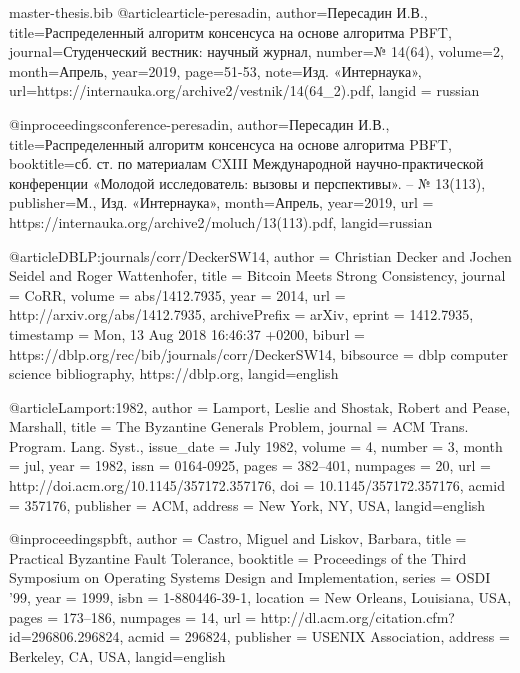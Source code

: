 \begin{filecontents}{master-thesis.bib}
@article{article-peresadin,
  author={Пересадин И.В.},
  title={{Распределенный алгоритм консенсуса на основе алгоритма PBFT}},
  journal={Студенческий вестник: научный журнал},
  number={№ 14(64)},
  volume={2},
  month={Апрель},
  year={2019},
  page={51-53},
  note={Изд. «Интернаука»},
  url={https://internauka.org/archive2/vestnik/14(64_2).pdf},
  langid = {russian}
}

@inproceedings{conference-peresadin,
  author={Пересадин И.В.},
  title={{Распределенный алгоритм консенсуса на основе алгоритма PBFT}},
  booktitle={сб. ст. по материалам CXIII Международной научно-практической конференции «Молодой исследователь: вызовы и перспективы». – № 13(113)},
  publisher={М., Изд. «Интернаука»},
  month={Апрель},
  year={2019},
  url = {https://internauka.org/archive2/moluch/13(113).pdf},
  langid={russian}
}

@article{DBLP:journals/corr/DeckerSW14,
  author    = {Christian Decker and
               Jochen Seidel and
               Roger Wattenhofer},
  title     = {Bitcoin Meets Strong Consistency},
  journal   = {CoRR},
  volume    = {abs/1412.7935},
  year      = {2014},
  url       = {http://arxiv.org/abs/1412.7935},
  archivePrefix = {arXiv},
  eprint    = {1412.7935},
  timestamp = {Mon, 13 Aug 2018 16:46:37 +0200},
  biburl    = {https://dblp.org/rec/bib/journals/corr/DeckerSW14},
  bibsource = {dblp computer science bibliography, https://dblp.org},
  langid={english}
}

@article{Lamport:1982,
 author = {Lamport, Leslie and Shostak, Robert and Pease, Marshall},
 title = {The Byzantine Generals Problem},
 journal = {ACM Trans. Program. Lang. Syst.},
 issue_date = {July 1982},
 volume = {4},
 number = {3},
 month = jul,
 year = {1982},
 issn = {0164-0925},
 pages = {382--401},
 numpages = {20},
 url = {http://doi.acm.org/10.1145/357172.357176},
 doi = {10.1145/357172.357176},
 acmid = {357176},
 publisher = {ACM},
 address = {New York, NY, USA},
 langid={english}
} 

@inproceedings{pbft,
 author = {Castro, Miguel and Liskov, Barbara},
 title = {Practical Byzantine Fault Tolerance},
 booktitle = {Proceedings of the Third Symposium on Operating Systems Design and Implementation},
 series = {OSDI '99},
 year = {1999},
 isbn = {1-880446-39-1},
 location = {New Orleans, Louisiana, USA},
 pages = {173--186},
 numpages = {14},
 url = {http://dl.acm.org/citation.cfm?id=296806.296824},
 acmid = {296824},
 publisher = {USENIX Association},
 address = {Berkeley, CA, USA},
 langid={english}
} 


\end{filecontents}
